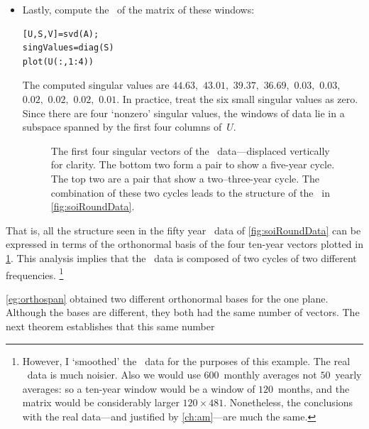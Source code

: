 \begin{example}
\begin{itemize}
\item Lastly, compute the \svd\ of the matrix of these windows:
\begin{verbatim}
[U,S,V]=svd(A);
singValues=diag(S)
plot(U(:,1:4))
\end{verbatim}
\setbox\ajrqrbox\hbox{}%
\marginajrbox%
The computed singular values are $44.63,$ $43.01,$ $39.37,$ $36.69,$ $0.03,$ $0.03,$ $0.02,$ $0.02,$ $0.02,$ $0.01$.
In practice, treat the six small singular values as zero.
Since there are four `nonzero' singular values, the windows of data lie in a subspace spanned by the first four columns of~\(U\).
\begin{figure}
\centering

\caption{The first four singular vectors of the \soi\ data---displaced vertically for clarity.  
The bottom two form a pair to show a five-year cycle.  
The top two are a pair that show a two--three-year cycle.  
The combination of these two cycles leads to the structure of the \soi\ in \cref{fig:soiRoundData}.}
\label{fig:soiRoundSubs}
\end{figure}%
\end{itemize}
That is, all the structure seen in the fifty year \soi\ data of \cref{fig:soiRoundData} can be expressed in terms of the  orthonormal basis of the four ten-year vectors plotted in \cref{fig:soiRoundSubs}.
This analysis implies that the \soi\ data is composed of two cycles of two different frequencies.%
\footnote{However, I `smoothed' the \soi\ data for the purposes of this example.  The real \soi\ data is much noisier.  
Also we would use \(600\)~monthly averages not \(50\)~yearly averages: so a ten-year window would be a window of \(120\)~months, and the matrix would be considerably larger \(120\times481\).  
Nonetheless, the conclusions with the real data---and justified by \cref{ch:am}---are much the same.}
\end{example}



\cref{eg:orthospan} obtained two different orthonormal bases for the one plane.  
Although the bases are different, they both had the same number of vectors.
The next theorem establishes that this same number 

